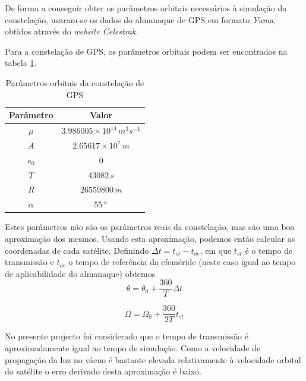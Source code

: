 \documentclass[palatino]{ist-report}
\begin{document}
De forma a conseguir obter os parâmetros orbitais necessários à simulação da constelação, usaram-se os dados do almanaque de GPS em formato \textit{Yuma}, obtidos através do \textit{website Celestrak}. 

Para a constelação de GPS, os parâmetros orbitais podem ser encontrados na tabela \ref{tab:parametros_orbitais_GPS}.

\begin{table}[ht]
    \centering
    \begin{tabular}{c c}\toprule
        \textbf{Parâmetro} & \textbf{Valor} \\
        \midrule
        $\mu$ & $3.986005\times10^{14}\,m^3s^{-1}$ \\
        $A$ & $2.65617\times10^{7}\,m$\\
        $e_0$ & $0$\\
        $T$ & $43082\,s$ \\
        $R$ & $26559800\,m$ \\
        $\alpha$ & $55\,\degree$ \\
        \bottomrule
    \end{tabular}
    \caption{Parâmetros orbitais da constelação de GPS}
    \label{tab:parametros_orbitais_GPS}
\end{table}

Estes parâmetros não são os parâmetros reais da constelação, mas são uma boa aproximação dos mesmos. Usando esta aproximação, podemos então calcular as coordenadas de cada satélite. Definindo $\Delta t = t_{st} - t_{oe}$, em que $t_{st}$ é o tempo de transmissão e $t_{oe}$ o tempo de referência da efeméride (neste caso igual ao tempo de aplicabilidade do almanaque) obtemos
\begin{equation*}
    \theta = \theta_0 + \frac{360}{T}\Delta t
\end{equation*}

\begin{equation*}
    \Omega = \Omega_0 + \frac{360}{2T}t_{st}
\end{equation*}

No presente projecto foi considerado que o tempo de transmissão é aproximadamente igual ao tempo de simulação. Como a velocidade de propagação da luz no vácuo é bastante elevada relativamente à velocidade orbital do satélite o erro derivado desta aproximação é baixo.
\end{document}
